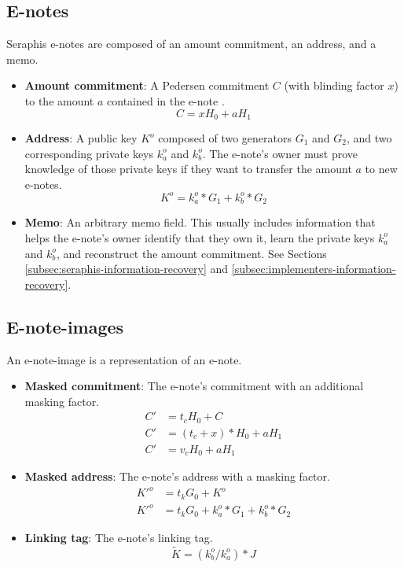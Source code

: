 \subsection{E-notes}
\label{subsec:seraphis-e-notes}

Seraphis e-notes are composed of an amount commitment, an address, and a memo.

\begin{itemize}
    \item \textbf{Amount commitment}: A Pedersen commitment $C$ (with blinding factor $x$) to the amount $a$ contained in the e-note \cite{Pedersen1992, maxwell-ct-2}.
    \[C = x H_0 + a H_1\]

    \item \textbf{Address}: A public key $K^o$ composed of two generators $G_1$ and $G_2$, and two corresponding private keys $k^o_a$ and $k^o_b$. The e-note's owner must prove knowledge of those private keys if they want to transfer the amount $a$ to new e-notes.\vspace{.115cm}
    \[K^o = k^o_a*G_1 + k^o_b*G_2\]

    \item \textbf{Memo}: An arbitrary memo field. This usually includes information that helps the e-note's owner identify that they own it, learn the private keys $k^o_a$ and $k^o_b$, and reconstruct the amount commitment. See Sections \ref{subsec:seraphis-information-recovery} and \ref{subsec:implementers-information-recovery}.
\end{itemize}


\subsection{E-note-images}
\label{subsec:seraphis-e-note-images}

An e-note-image is a representation of an e-note.

\begin{itemize}
    \item \textbf{Masked commitment}: The e-note's commitment with an additional masking factor.\vspace{.115cm}
    \begin{align*}
        C' &= t_c H_0 + C \\
        C' &= (t_c + x)*H_0 + a H_1 \\
        C' &= v_c H_0 + a H_1
    \end{align*}

    \item \textbf{Masked address}: The e-note's address with a masking factor.\vspace{.115cm}
    \begin{align*}
        K'^o &= t_k G_0 + K^o \\
        K'^o &= t_k G_0 + k^o_a*G_1 + k^o_b*G_2
    \end{align*}

    \item \textbf{Linking tag}: The e-note's linking tag.\vspace{.115cm}
    \[\tilde{K} = (k^o_b/k^o_a)*J\]
\end{itemize}

